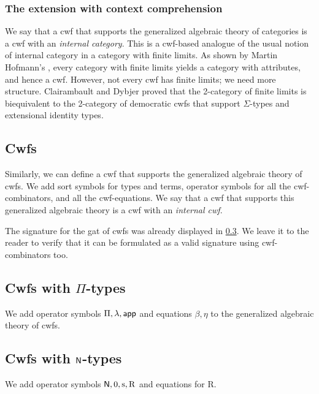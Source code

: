 \documentclass{lmcs}
\newcommand{\s}{\mathrm{s}}
\newcommand{\Rec}{\mathrm{R}}
\begin{document}
\subsubsection{The extension with context comprehension}

We say that a cwf that supports the generalized algebraic theory of categories is a cwf with an {\em internal category}. This is a cwf-based analogue of the usual notion of internal category in a category with finite limits. As shown by Martin Hofmann's \cite{hofmann:csl,hofmann:cambridge}, every category with finite limits yields a category with attributes, and hence a cwf. However, not every cwf has finite limits; we need more structure.  Clairambault and Dybjer \cite{ClairambaultD11,ClairambaultD14} proved that the 2-category of finite limits is biequivalent to the 2-category of democratic cwfs that support $\Sigma$-types and extensional identity types.

\subsection{Cwfs} Similarly, we can define a cwf that supports the generalized algebraic theory of cwfs. We add sort symbols for types and terms, operator symbols for all the cwf-combinators, and all the cwf-equations. We say that a cwf that supports this generalized algebraic theory is a cwf with an {\em internal cwf}.

The signature for the gat of cwfs was already displayed in \ref{}. We leave it to the reader to verify that it can be formulated as a valid signature using cwf-combinators too.

\subsection{Cwfs with $\Pi$-types} 
We add operator symbols $\Pi, \lambda, \mathsf{app}$ and equations $\beta, \eta$ to the generalized algebraic theory of cwfs. 

\subsection{Cwfs with $\mathsf{N}$-types} 
We add operator symbols $\N, 0, \s, \Rec$ and equations for $\Rec$.
\end{document}
